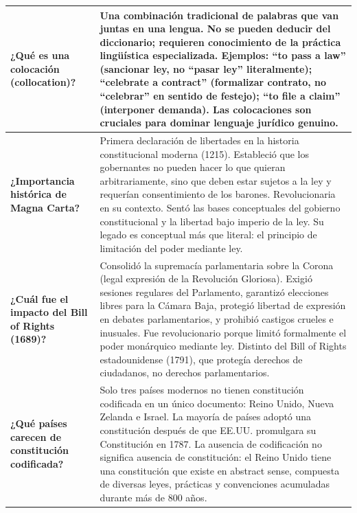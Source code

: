 \documentclass[12pt,oneside]{book}
\begin{document}
\begin{table}[H]
\begin{tabularx}{\textwidth}{
    >{\raggedright\arraybackslash}p{}
    >{\raggedright\arraybackslash}X
}
\textbf{¿Qué es una colocación (collocation)?} & 
Una combinación tradicional de palabras que van juntas en una lengua. No se pueden deducir del diccionario; requieren conocimiento de la práctica lingüística especializada. Ejemplos: ``to pass a law'' (sancionar ley, no ``pasar ley'' literalmente); ``celebrate a contract'' (formalizar contrato, no ``celebrar'' en sentido de festejo); ``to file a claim'' (interponer demanda). Las colocaciones son cruciales para dominar lenguaje jurídico genuino. \\
\midrule

\textbf{¿Importancia histórica de Magna Carta?} & 
Primera declaración de libertades en la historia constitucional moderna (1215). Estableció que los gobernantes no pueden hacer lo que quieran arbitrariamente, sino que deben estar sujetos a la ley y requerían consentimiento de los barones. Revolucionaria en su contexto. Sentó las bases conceptuales del gobierno constitucional y la libertad bajo imperio de la ley. Su legado es conceptual más que literal: el principio de limitación del poder mediante ley. \\
\midrule

\textbf{¿Cuál fue el impacto del Bill of Rights (1689)?} & 
Consolidó la supremacía parlamentaria sobre la Corona (legal expresión de la Revolución Gloriosa). Exigió sesiones regulares del Parlamento, garantizó elecciones libres para la Cámara Baja, protegió libertad de expresión en debates parlamentarios, y prohibió castigos crueles e inusuales. Fue revolucionario porque limitó formalmente el poder monárquico mediante ley. Distinto del Bill of Rights estadounidense (1791), que protegía derechos de ciudadanos, no derechos parlamentarios. \\
\midrule

\textbf{¿Qué países carecen de constitución codificada?} & 
Solo tres países modernos no tienen constitución codificada en un único documento: Reino Unido, Nueva Zelanda e Israel. La mayoría de países adoptó una constitución después de que EE.UU. promulgara su Constitución en 1787. La ausencia de codificación no significa ausencia de constitución: el Reino Unido tiene una constitución que existe en abstract sense, compuesta de diversas leyes, prácticas y convenciones acumuladas durante más de 800 años. \\
\midrule


\end{tabularx}
\end{table}
\end{document}

